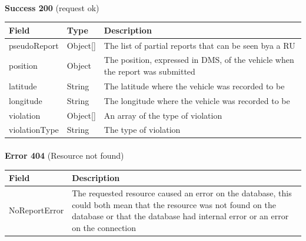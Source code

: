 						\paragraph{}
							\textbf{Success 200} (request ok)
							\begin{table}[!h]
								\begin{tabular}{L{0.23\textwidth}L{0.15\textwidth}L{0.42\textwidth}}
									\toprule
									Field & Type & Description \\
									\midrule
									pseudoReport & Object[] & The list of partial reports that can be seen bya a RU \\
									\hspace{2.5mm} position & Object & The position, expressed in DMS, of the vehicle when the report was submitted  \\
									\hspace{5mm} latitude & String & The latitude where the vehicle was recorded to be \\
									\hspace{5mm} longitude & String & The longitude where the vehicle was recorded to be \\
									\hspace{2.5mm}violation & Object[] & An array of the type of violation \\
									\hspace{5mm}violationType & String & The type of violation  \\
								 	\bottomrule
								\end{tabular}
							\end{table}
						\clearpage
						\paragraph{}
							\textbf{Error 404} (Resource not found)
							\begin{table}[!h]
								\begin{tabular}{L{0.4\textwidth}L{0.4\textwidth}}
									\toprule
									Field & Description \\
									\midrule
								  	NoReportError & The requested resource caused an error on the database, this could both mean that the resource was not found on the database or that the database had internal error or an error on the connection \\
								 	\bottomrule
								\end{tabular}
							\end{table}
							
